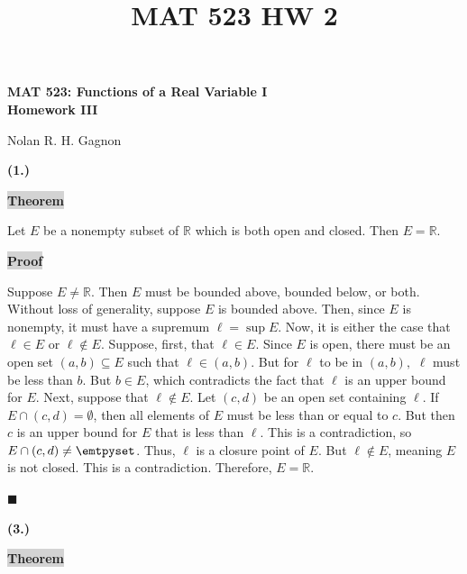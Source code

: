 \documentclass[12pt]{article}
\title{MAT 523 HW 2}
\newcommand{\mybox}{%
    \collectbox{%
        \setlength{\fboxsep}{2pt}%
        \fbox{\BOXCONTENT}%
    }%
}
\begin{document}
\begin{center}
\begin{large}
\textbf{MAT 523: Functions of a Real Variable I \\
Homework III \\}
\end{large}
Nolan R. H. Gagnon \\
\end{center}

\noindent \textbf{(1.)}

\vspace{3mm}

\noindent\mybox{\colorbox{lightgray}{\textbf{Theorem}}}\hspace{3mm}\hrulefill

\noindent Let $E$ be a nonempty subset of $\mathbb{R}$ which is both open and closed. Then $E = \mathbb{R}$. 

\vspace{5mm}

\noindent\mybox{\colorbox{lightgray}{\textbf{Proof}}}\hspace{3mm}\hrulefill

\noindent Suppose $E\neq\mathbb{R}$. Then $E$ must be bounded above, bounded below, or both. Without loss of generality, suppose $E$ is bounded above. Then, since $E$ is nonempty, it must have a supremum $\ell = \sup E$. Now, it is either the case that $\ell\in E$ or $\ell\not\in E$.  Suppose, first, that $\ell\in E$. Since $E$ is open, there must be an open set $(a,b)\subseteq E$ such that $\ell\in(a,b).$ But for $\ell$ to be in $(a,b),$ $\ell$ must be less than $b$. But $b\in E$, which contradicts the fact that $\ell$ is an upper bound for $E$.  Next, suppose that $\ell\not\in E$. Let $(c,d)$ be an open set containing $\ell$. If $E\cap(c,d)=\emptyset$, then all elements of $E$ must be less than or equal to $c$. But then $c$ is an upper bound for $E$ that is less than $\ell$. This is a contradiction, so $E\cap(c,d)\neq\emtpyset$. Thus, $\ell$ is a closure point of $E$. But $\ell\not\in E$, meaning $E$ is not closed. This is a contradiction.  Therefore, $E = \mathbb{R}.$

\hfill$\blacksquare$

\pagebreak

\noindent \textbf{(3.)} 

\vspace{3mm}

\noindent\mybox{\colorbox{lightgray}{\textbf{Theorem}}}\hspace{3mm}\hrulefill 
\end{document}

